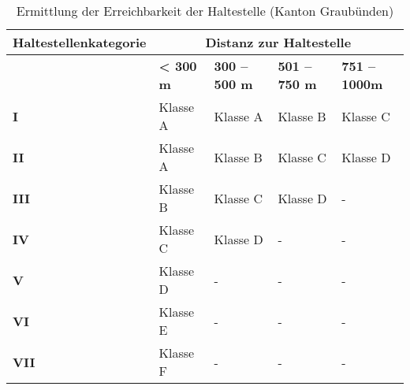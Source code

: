 \begin{table}[ht]
    \begin{tabular}[c]{l p{2.5cm} p{2.5cm} p{2.5cm} p{2.5cm}}
        \toprule
        \textbf{Haltestellenkategorie}
                                & \multicolumn{4}{c}{\textbf{Distanz zur \gls{Haltestelle}}}\\
        \midrule
        \textbf{}
                                & \textbf{< 300 m}
                                & \textbf{300 -- 500 m}
                                & \textbf{501 -- 750 m}
                                & \textbf{751 -- 1000m}\\
        \textbf{I}
                                & Klasse A
                                & Klasse A
                                & Klasse B
                                & Klasse C\\
        \textbf{II}
                                & Klasse A
                                & Klasse B
                                & Klasse C
                                & Klasse D\\
        \textbf{III}
                                & Klasse B
                                & Klasse C
                                & Klasse D
                                & -\\
        \textbf{IV}
                                & Klasse C
                                & Klasse D
                                & -
                                & -\\
        \textbf{V}
                                & Klasse D
                                & -
                                & -
                                & -\\
        \cellcolor{red!25}\textbf{VI}
                                & \cellcolor{red!25}Klasse E
                                & -
                                & -
                                & -\\
        \cellcolor{red!25}\textbf{VII}
                                & \cellcolor{red!25}Klasse F
                                & -
                                & -
                                & -\\                                
        \bottomrule
    \end{tabular}
    \caption{Ermittlung der Erreichbarkeit der \gls{Haltestelle} (Kanton Graubünden)}
    \label{table:Ermittlung Erreichbarkeit der Haltestelle (Kanton Graubünden)}
\end{table}

